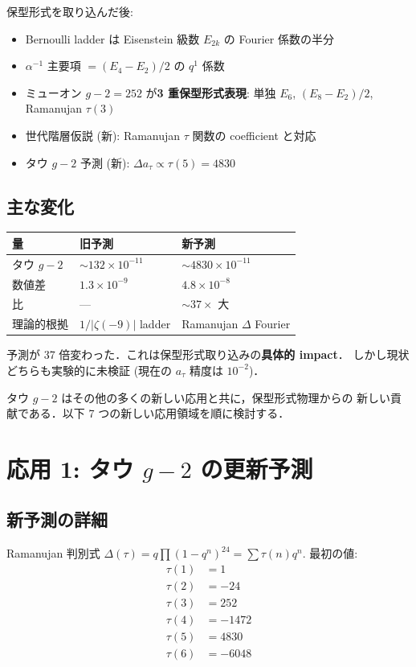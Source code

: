 \documentclass[11pt,a4paper]{article}
\begin{document}
保型形式を取り込んだ後:
\begin{itemize}
\item Bernoulli ladder は Eisenstein 級数 $E_{2k}$ の Fourier 係数の半分
\item $\alpha^{-1}$ 主要項 $= (E_4 - E_2)/2$ の $q^1$ 係数
\item ミューオン $g-2 = 252$ が\textbf{3 重保型形式表現}: 単独 $E_6$,
$(E_8 - E_2)/2$, Ramanujan $\tau(3)$
\item 世代階層仮説 (新): Ramanujan $\tau$ 関数の coefficient と対応
\item タウ $g-2$ 予測 (新): $\Delta a_\tau \propto \tau(5) = 4830$
\end{itemize}

\subsection{主な変化}

\begin{center}
\begin{tabular}{lll}
\toprule
量 & 旧予測 & 新予測 \\
\midrule
タウ $g-2$ & $\sim 132 \times 10^{-11}$ & $\sim 4830 \times 10^{-11}$ \\
数値差 & $1.3 \times 10^{-9}$ & $4.8 \times 10^{-8}$ \\
比 & — & $\sim 37\times$ 大 \\
理論的根拠 & $1/|\zeta(-9)|$ ladder & Ramanujan $\Delta$ Fourier \\
\bottomrule
\end{tabular}
\end{center}

予測が 37 倍変わった．これは保型形式取り込みの\textbf{具体的 impact}．
しかし現状どちらも実験的に未検証 (現在の $a_\tau$ 精度は $10^{-2}$)．

タウ $g-2$ はその他の多くの新しい応用と共に，保型形式物理からの
新しい貢献である．以下 7 つの新しい応用領域を順に検討する．

\section{応用 1: タウ $g-2$ の更新予測}

\subsection{新予測の詳細}

Ramanujan 判別式 $\Delta(\tau) = q\prod(1-q^n)^{24} = \sum \tau(n)q^n$.
最初の値:
\begin{align}
\tau(1) &= 1\\
\tau(2) &= -24\\
\tau(3) &= 252\\
\tau(4) &= -1472\\
\tau(5) &= 4830\\
\tau(6) &= -6048
\end{align}
\end{document}
